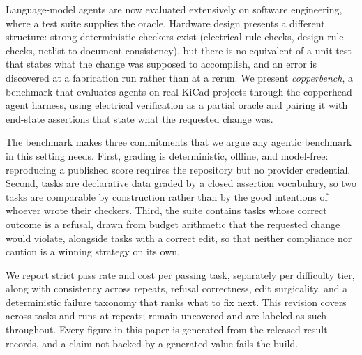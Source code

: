 Language-model agents are now evaluated extensively on software engineering, where a test suite supplies the oracle. Hardware design presents a different structure: strong deterministic checkers exist (electrical rule checks, design rule checks, netlist-to-document consistency), but there is no equivalent of a unit test that states what the change was supposed to accomplish, and an error is discovered at a fabrication run rather than at a rerun. We present \emph{copperbench}, a benchmark that evaluates agents on real KiCad projects through the copperhead agent harness, using electrical verification as a partial oracle and pairing it with end-state assertions that state what the requested change was.

The benchmark makes three commitments that we argue any agentic benchmark in this setting needs. First, grading is deterministic, offline, and model-free: reproducing a published score requires the repository but no provider credential. Second, tasks are declarative data graded by a closed assertion vocabulary, so two tasks are comparable by construction rather than by the good intentions of whoever wrote their checkers. Third, the suite contains tasks whose correct outcome is a refusal, drawn from budget arithmetic that the requested change would violate, alongside tasks with a correct edit, so that neither compliance nor caution is a winning strategy on its own.

We report strict pass rate and cost per passing task, separately per difficulty tier, along with consistency across repeats, refusal correctness, edit surgicality, and a deterministic failure taxonomy that ranks what to fix next. This revision covers \segmentsCovered{} across \taskCount{} tasks and \recordCount{} runs at \repeatCount{} repeats; \segmentsAbsent{} remain uncovered and are labeled as such throughout. Every figure in this paper is generated from the released result records, and a claim not backed by a generated value fails the build.
